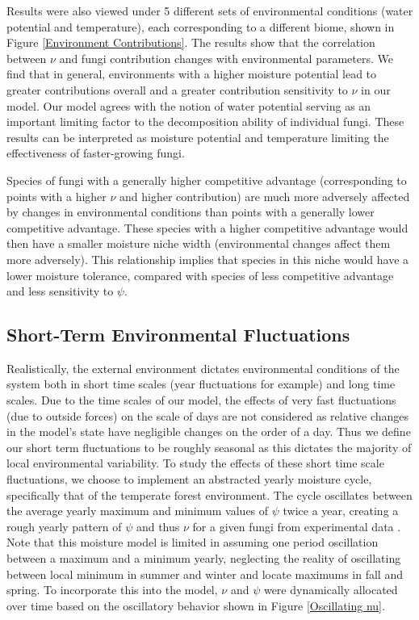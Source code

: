 \documentclass[12pt]{article}
\begin{document}
\begin{multicols}{2}

Results were also viewed under 5 different sets of environmental conditions (water potential and temperature), each corresponding to a different biome, shown in Figure \ref{Environment Contributions}. The results show that the correlation between $\nu$ and fungi contribution changes with environmental parameters. We find that in general, environments with a higher moisture potential lead to greater contributions overall and a greater contribution sensitivity to $\nu$ in our model. Our model agrees with the notion of water potential serving as an important limiting factor to the decomposition ability of individual fungi. These results can be interpreted as moisture potential and temperature limiting the effectiveness of faster-growing fungi.  

Species of fungi with a generally higher competitive advantage (corresponding to points with a higher $\nu$ and higher contribution) are much more adversely affected by changes in environmental conditions than points with a generally lower competitive advantage. These species with a higher competitive advantage would then have a smaller moisture niche width (environmental changes affect them more adversely). This relationship implies that species in this niche would have a lower moisture tolerance, compared with species of less competitive advantage and less sensitivity to $\psi$. %

\subsection{Short-Term Environmental Fluctuations}


Realistically, the external environment dictates environmental conditions of the system both in short time scales (year fluctuations for example) and long time scales. Due to the time scales of our model, the effects of very fast fluctuations (due to outside forces) on the scale of days are not considered as relative changes in the model's state have negligible changes on the order of a day. Thus we define our short term fluctuations to be roughly seasonal as this dictates the majority of local environmental variability. To study the effects of these short time scale fluctuations, we choose to implement an abstracted yearly moisture cycle, specifically that of the temperate forest environment. The cycle oscillates between the average yearly maximum and minimum values of $\psi$ twice a year, creating a rough yearly pattern of $\psi$ and thus $\nu$ for a given fungi from experimental data \cite{Zobel2001}\cite{Maynard2019}. Note that this moisture model is limited in assuming one period oscillation between a maximum and a minimum yearly, neglecting the reality of oscillating between local minimum in summer and winter and locate maximums in fall and spring. To incorporate this into the model, $\nu$ and $\psi$ were dynamically allocated over time based on the oscillatory behavior shown in Figure \ref{Oscillating nu}. 


\end{multicols}
\end{document}
